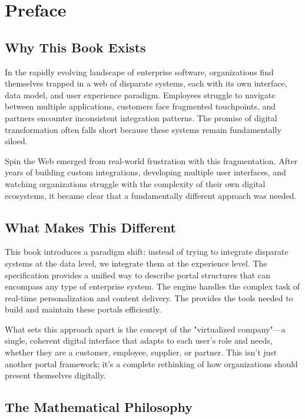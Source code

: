 
\chapter*{Preface}

\section*{Why This Book Exists}

In the rapidly evolving landscape of enterprise software, organizations find themselves trapped in a web of disparate systems, each with its own interface, data model, and user experience paradigm. Employees struggle to navigate between multiple applications, customers face fragmented touchpoints, and partners encounter inconsistent integration patterns. The promise of digital transformation often falls short because these systems remain fundamentally siloed.

Spin the Web emerged from real-world frustration with this fragmentation. After years of building custom integrations, developing multiple user interfaces, and watching organizations struggle with the complexity of their own digital ecosystems, it became clear that a fundamentally different approach was needed.

\section*{What Makes This Different}

This book introduces a paradigm shift: instead of trying to integrate disparate systems at the data level, we integrate them at the experience level. The \wbdl specification provides a unified way to describe portal structures that can encompass any type of enterprise system. The \webspinner engine handles the complex task of real-time personalization and content delivery. The \studio provides the tools needed to build and maintain these portals efficiently.

What sets this approach apart is the concept of the "virtualized company"—a single, coherent digital interface that adapts to each user's role and needs, whether they are a customer, employee, supplier, or partner. This isn't just another portal framework; it's a complete rethinking of how organizations should present themselves digitally.

\section*{The Mathematical Philosophy}

